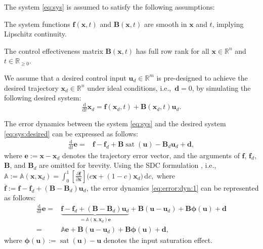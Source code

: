 \documentclass{ifacconf}
\newcommand\ie{\textrm{i.e.,\ }}
\newcommand\R{\mathbb{R}}
\newcommand*{\mv}[1]{\boldsymbol{#1}} %
\newcommand*{\mm}[1]{\boldsymbol{#1}} %
\DeclareMathOperator{\mysat}{{sat}}       %
\newcommand\der{\mathrm d}
\newcommand*{\ddtt}{
   \tfrac{\der}{\der t}
}
\newcommand*{\pptfrac}[2]{
   \tfrac{\partial {#1}}{\partial {#2}}
}
\begin{document}
The system \eqref{eq:sys} is assumed to satisfy the following assumptions:

\begin{assum} \label{assum:sys:smooth}
   The system functions $\mv{f}(\mv{x},t)$ and $\mm{B}(\mv{x},t)$ are smooth in $\mv{x}$ and $t$, implying Lipschitz continuity.
\end{assum}

\begin{assum}[Full row rank of $\mm{B}$] \label{assum:sys:B}
   The control effectiveness matrix $\mm{B}(\mv{x},t)$ has full row rank for all $\mv{x}\in\R^n$ and $t\in\R_{\geq 0}$.
\end{assum}


We assume that a desired control input $\mv{u}_d\in\R^m$ is pre-designed to achieve the desired trajectory $\mv{x}_d\in\R^n$ under ideal conditions, \ie $\mv{d}=0$, by simulating the following desired system:
\begin{equation} \label{eq:sys:desired}
   \ddtt\mv{x}_d   =
   \mv{f}(\mv{x}_d, t)   
   +
   \mm{B}(\mv{x}_d,t) \mv{u}_d
   .
\end{equation}

The error dynamics between the system \eqref{eq:sys} and the desired system \eqref{eq:sys:desired} can be expressed as follows:
\begin{equation} \label{eq:error:dyn:1}
   \begin{aligned}
      \ddtt\mv{e}
      =&
      \mv{f}-\mv{f}_d
      + \mm{B} \mysat(\mv{u})
      - \mm{B}_d \mv{u}_d
      + \mv{d}
      ,
   \end{aligned}
\end{equation}
where $\mv{e}:=\mv{x}-\mv{x}_d$ denotes the trajectory error vector, and the arguments of $\mv{f}$, $\mv{f}_d$, $\mm{B}$, and $\mm{B}_d$ are omitted for brevity.
Using the SDC formulation \cite{Dani:2015aa}, \ie 
$
   \mathbb{A}
   :=
   \mathbb{A}(\mv{x},\mv{x}_d)
   =
   \int_0^1 
   \left[
      \pptfrac{\overline{\mv{f}}}{\mv{x}}
   \right]
   \big(
      c \mv{x} + (1-c) \mv{x}_d
   \big)
   \,\der c
   ,
$ 
where $\overline{\mv{f}}:=\mv{f}-\mv{f}_d+(\mm{B}-\mm{B}_d)\mv{u}_d$, the error dynamics \eqref{eq:error:dyn:1} can be represented as follows:
\begin{equation} \label{eq:error:dyn:2}
   \begin{aligned}
      \ddtt\mv{e}
      =&
      \underbrace
      {
         \mv{f}-\mv{f}_d
         +
         (
            \mm{B} 
            - \mm{B}_d 
         ) \mv{u}_d
      }_{= \mathbb{A}(\mv{x},\mv{x}_d) \mv{e}}
      + \mm{B} 
      (
         \mv{u} - \mv{u}_d
      )
      + \mm{B} \mv{\phi}(\mv{u}) + \mv{d}
      \\
      =&
      \mathbb{A} \mv{e}
      + \mm{B} 
      (\mv{u} - \mv{u}_d)
      + \mm{B} \mv{\phi}(\mv{u}) + \mv{d}
      ,
   \end{aligned}
\end{equation}
where $\mv{\phi}(\mv{u}):=\mysat(\mv{u}) - \mv{u}$ denotes the input saturation effect.
\end{document}
